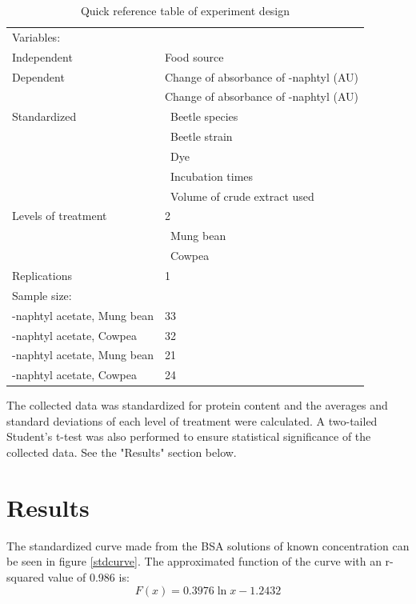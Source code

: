 \documentclass[12pt]{article}
\begin{document}
	\begin{table}[h]
		\centering
		\begin{tabular}{|l|l|}
			\hline
			Variables:&\\
			\qquad Independent & Food source \\ \hline
			\qquad Dependent & Change of absorbance of \textalpha-naphtyl (\si{AU})\\& Change of absorbance of \textbeta-naphtyl (\si{AU})\\ \hline
			\qquad Standardized & \quad\textbullet\ Beetle species\\ 
			& \quad\textbullet\ Beetle strain \\
			& \quad\textbullet\ Dye \\
			& \quad\textbullet\ Incubation times \\
			& \quad\textbullet\ Volume of crude extract used\\ \hline
			Levels of treatment & 2\\
			& \quad\textbullet\ Mung bean \\
			& \quad\textbullet\ Cowpea\\ \hline
			Replications & 1 \\ \hline
			Sample size: &\\
			\qquad \textalpha-naphtyl acetate, Mung bean & 33 \\
			\qquad \textalpha-naphtyl acetate, Cowpea & 32 \\
			\qquad \textbeta-naphtyl acetate, Mung bean & 21 \\
			\qquad \textbeta-naphtyl acetate, Cowpea & 24 \\
			\hline
		\end{tabular}
		\caption{Quick reference table of experiment design}
		\label{refTable}
	\end{table}
	
	The collected data was standardized for protein content and the averages and standard deviations of each level of treatment were calculated. A two-tailed Student's t-test was also performed to ensure statistical significance of the collected data. See the "Results" section below. \newpage
	
\section{Results}
	The standardized curve made from the BSA solutions of known concentration can be seen in figure \ref{stdcurve}. The approximated function of the curve with an r-squared value of 0.986 is:
	\begin{equation}\label{eq1}
	F(x)=0.3976\ln x-1.2432
	\end{equation}
	
\end{document}
